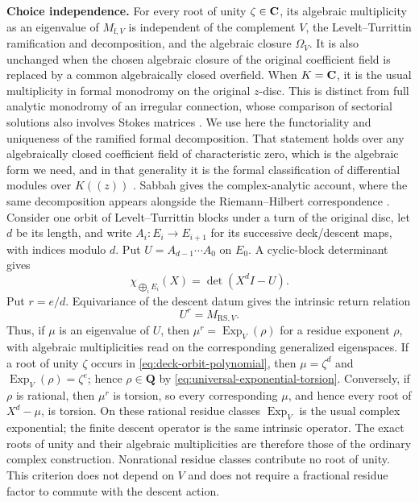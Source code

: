 \noindent\textbf{Choice independence.}
For every root of unity \(\zeta\in\mathbf C\), its algebraic multiplicity as an
eigenvalue of \(M_{\mathrm f,V}\) is independent of the complement \(V\), the
Levelt--Turrittin ramification and decomposition, and the algebraic closure
\(\Omega_V\).  It is also unchanged when the chosen algebraic closure of the
original coefficient field is replaced by a common algebraically closed
overfield.  When \(K=\mathbf C\), it is the usual multiplicity in formal monodromy
on the original \(z\)-disc. This is distinct from full analytic monodromy
of an irregular connection, whose comparison of sectorial solutions also
involves Stokes matrices \cite[Lecture~5]{SabbahStokes}.
We use here the functoriality and uniqueness of the ramified formal
decomposition.  That statement holds over any algebraically closed coefficient
field of characteristic zero, which is the algebraic form we need, and in that
generality it is the formal classification of differential modules over
\(K(\!(z)\!)\) \cite[Chapter~3]{PutSinger}.  Sabbah gives the
complex-analytic account, where the same decomposition appears alongside the
Riemann--Hilbert correspondence
\cite[Lecture~5, Section~5.c, proofs of Theorem~5.8 and
Proposition~5.10]{SabbahStokes}.
Consider one orbit of Levelt--Turrittin blocks under a turn of the original
disc, let \(d\) be its length, and write
\(A_i:E_i\longrightarrow E_{i+1}\) for its successive deck/descent maps,
with indices modulo \(d\).  Put
\(U=A_{d-1}\cdots A_0\) on \(E_0\).  A cyclic-block determinant gives
\[
 \chi_{\bigoplus_iE_i}(X)=\det(X^dI-U).
 \label{eq:deck-orbit-polynomial}
\]
Put \(r=e/d\).  Equivariance of the descent datum gives the intrinsic return
relation
\[
 U^r=M_{\mathrm{RS},V}.
 \label{eq:deck-return-power}
\]
Thus, if \(\mu\) is an eigenvalue of \(U\), then
\(\mu^r=\operatorname{Exp}_V(\rho)\) for a residue exponent \(\rho\), with
algebraic multiplicities read on the corresponding generalized eigenspaces.
If a root of unity \(\zeta\) occurs in
\eqref{eq:deck-orbit-polynomial}, then \(\mu=\zeta^d\) and
\(\operatorname{Exp}_V(\rho)=\zeta^e\); hence \(\rho\in\mathbf Q\) by
\eqref{eq:universal-exponential-torsion}.  Conversely, if \(\rho\) is
rational, then \(\mu^r\) is torsion, so every corresponding \(\mu\), and
hence every root of \(X^d-\mu\), is torsion.  On these rational residue
classes \(\operatorname{Exp}_V\) is the usual complex exponential; the
finite descent operator is the same intrinsic operator.  The exact roots of
unity and their algebraic multiplicities are therefore those of the ordinary
complex construction.  Nonrational residue classes contribute no root of
unity.  This criterion does not depend on \(V\) and does not require a
fractional residue factor to commute with the descent action.

